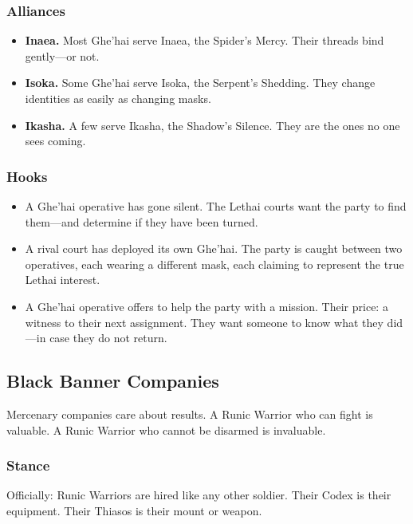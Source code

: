 \subsubsection{Alliances}

\begin{itemize}
\item \textbf{Inaea.} Most Ghe'hai serve Inaea, the Spider's Mercy. Their threads bind gently—or not.
\item \textbf{Isoka.} Some Ghe'hai serve Isoka, the Serpent's Shedding. They change identities as easily as changing masks.
\item \textbf{Ikasha.} A few serve Ikasha, the Shadow's Silence. They are the ones no one sees coming.
\end{itemize}

\subsubsection{Hooks}

\begin{itemize}
\item A Ghe'hai operative has gone silent. The Lethai courts want the party to find them—and determine if they have been turned.
\item A rival court has deployed its own Ghe'hai. The party is caught between two operatives, each wearing a different mask, each claiming to represent the true Lethai interest.
\item A Ghe'hai operative offers to help the party with a mission. Their price: a witness to their next assignment. They want someone to know what they did—in case they do not return.
\end{itemize}

\subsection{Black Banner Companies}

Mercenary companies care about results. A Runic Warrior who can fight is valuable. A Runic Warrior who cannot be disarmed is invaluable.

\subsubsection{Stance}

Officially: Runic Warriors are hired like any other soldier. Their Codex is their equipment. Their Thiasos is their mount or weapon.

